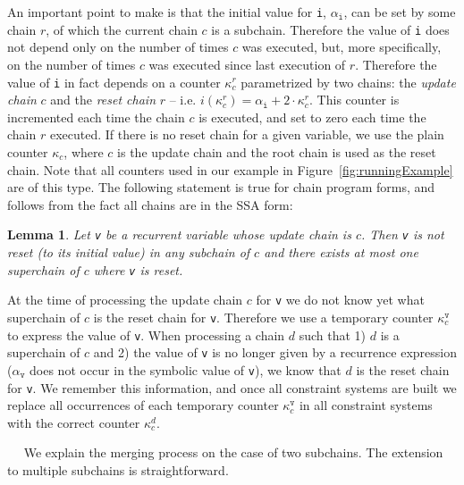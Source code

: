 \documentclass{llncs}
\newtheorem{lem}{Lemma}
\renewcommand{\paragraph}[1]{\vspace{0.2cm}\noindent{\bf #1}~~}
\begin{document}
An important point to make is that the initial value for \texttt{i},
$\alpha_\mathtt{i}$, can be set by some chain $r$, of which the current
chain $c$ is a subchain. Therefore the value of \texttt{i} does not depend
only on the number of times $c$ was executed, but, more specifically, on the number of times $c$
was executed since last execution of $r$. Therefore the value of \texttt{i}
in fact depends on a counter $\kappa_c^{r}$ parametrized by two chains:
the \emph{update chain} $c$ and the \emph{reset chain} $r$ --
i.e. $i(\kappa_c^{r})=\alpha_\mathtt{i}+2\cdot\kappa_c^{r}$. This counter
is incremented each time the chain $c$ is executed, and set to zero each
time the chain $r$ executed. If there is no reset chain for a given
variable, we use the plain counter $\kappa_c$, where $c$ is the update
chain and the root chain is used as the reset chain. Note that all counters used in our example in
Figure~\ref{fig:runningExample} are of this type. The following statement is
true for chain program forms, and follows from the fact all chains are in
the SSA form:

\begin{lem}
  Let \texttt{v} be a recurrent variable whose update chain is $c$. Then
  \texttt{v} is not reset (to its initial value) in any subchain of $c$ and
  there exists at most one superchain of $c$ where \texttt{v} is reset.
\end{lem}

At the time of processing the update chain $c$ for \texttt{v} we do not know
yet what superchain of $c$ is the reset chain for \texttt{v}. Therefore we
use a temporary counter $\kappa_c^\mathtt{v}$ to express the value of
\texttt{v}. When processing a chain $d$ such that 1) $d$ is a superchain of
$c$ and 2) the value of \texttt{v} is no longer given by a recurrence
expression ($\alpha_\mathtt{v}$ does not occur in the symbolic value of
\texttt{v}), we know that $d$ is the reset chain for \texttt{v}. We remember
this information, and once all constraint systems are built we replace all
occurrences of each temporary counter $\kappa_c^\mathtt{v}$ in all constraint
systems with the correct counter $\kappa_c^d$.


\paragraph{Merging values from subchains}
We explain the merging process on the case of two subchains. The extension
to multiple subchains is straightforward.
\end{document}
